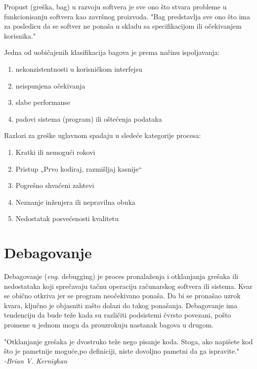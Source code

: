 \documentclass[a4paper]{article}
\begin{document}
Propust (greška, bag) u razvoju softvera je sve ono što stvara probleme u funkcionisanju softvera 
kao završnog proizvoda. "Bag predstavlja sve ono što ima za posledicu da se softver ne ponaša u 
skladu sa specifikacijom ili očekivanjem korisnika."

\vspace{4mm}

Jedna od uobičajenih klasifikacija bagova je prema načinu ispoljavanja:
\begin{enumerate}
\item nekonzistentnosti u korisničkom interfejsu
\item neispunjena očekivanja
\item slabe performanse
\item padovi sistema (program) ili oštećenja podataka
\end{enumerate}

\vspace{4mm}

Razlozi za greške uglavnom spadaju u sledeće kategorije procesa:
\begin{enumerate}
\item Kratki ili nemogući rokovi
\item Pristup „Prvo kodiraj, razmišljaj kasnije“
\item Pogrešno shvaćeni zahtevi
\item Neznanje inženjera ili nepravilna obuka
\item Nedostatak posvećenosti kvalitetu
\end{enumerate}


\section{Debagovanje}	
\label{sec:debagovanje}

Debagovanje (\textit{eng.} debugging) je proces pronalaženja i otklanjanja grešaka ili 
nedostataka koji sprečavaju tačnu operaciju računarskog softvera ili sistema. Kvar se 
obično otkriva jer se program neočekivano ponaša. Da bi se pronašao uzrok kvara, 
ključno je objasniti zašto dolazi do takog ponašanja. Debagovanje ima tendenciju da 
bude teže kada su različiti podsistemi čvrsto povezani, pošto promene u jednom mogu da 
prouzrokuju nastanak bagova u drugom.

\vspace{4mm}

"Otklanjanje grešaka je dvostruko teže nego pisanje koda. Stoga, ako napišete kod što 
je pametnije moguće,po definiciji, niste dovoljno pametni da ga ispravite."\\
\hspace*{0pt}\hfill\textit{-Brian V. Kernighan}
\end{document}
